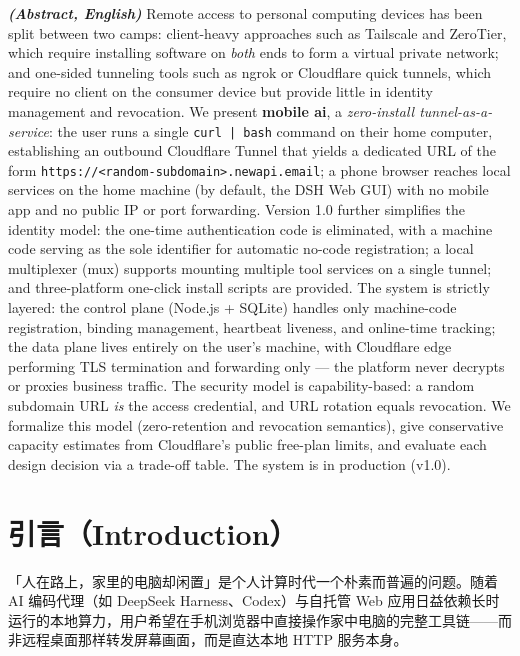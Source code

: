 \documentclass[10pt,a4paper]{article}
\newcommand{\sys}{mobile ai}
\begin{document}
\vspace{1em}
\noindent\textbf{\textit{(Abstract, English)}} Remote access to personal computing devices has been split between two camps: client-heavy approaches such as Tailscale and ZeroTier, which require installing software on \textit{both} ends to form a virtual private network; and one-sided tunneling tools such as ngrok or Cloudflare quick tunnels, which require no client on the consumer device but provide little in identity management and revocation. We present \textbf{\sys}, a \textit{zero-install tunnel-as-a-service}: the user runs a single \texttt{curl\ | bash} command on their home computer, establishing an outbound Cloudflare Tunnel that yields a dedicated URL of the form \texttt{https://<random-subdomain>.newapi.email}; a phone browser reaches local services on the home machine (by default, the DSH Web GUI) with no mobile app and no public IP or port forwarding. Version 1.0 further simplifies the identity model: the one-time authentication code is eliminated, with a machine code serving as the sole identifier for automatic no-code registration; a local multiplexer (mux) supports mounting multiple tool services on a single tunnel; and three-platform one-click install scripts are provided. The system is strictly layered: the control plane (Node.js + SQLite) handles only machine-code registration, binding management, heartbeat liveness, and online-time tracking; the data plane lives entirely on the user's machine, with Cloudflare edge performing TLS termination and forwarding only --- the platform never decrypts or proxies business traffic. The security model is capability-based: a random subdomain URL \textit{is} the access credential, and URL rotation equals revocation. We formalize this model (zero-retention and revocation semantics), give conservative capacity estimates from Cloudflare's public free-plan limits, and evaluate each design decision via a trade-off table. The system is in production (v1.0).

\section{引言（Introduction）}

「人在路上，家里的电脑却闲置」是个人计算时代一个朴素而普遍的问题。随着 AI 编码代理（如 DeepSeek Harness、Codex）与自托管 Web 应用日益依赖长时运行的本地算力，用户希望在手机浏览器中直接操作家中电脑的完整工具链——而非远程桌面那样转发屏幕画面，而是直达本地 HTTP 服务本身。
\end{document}
